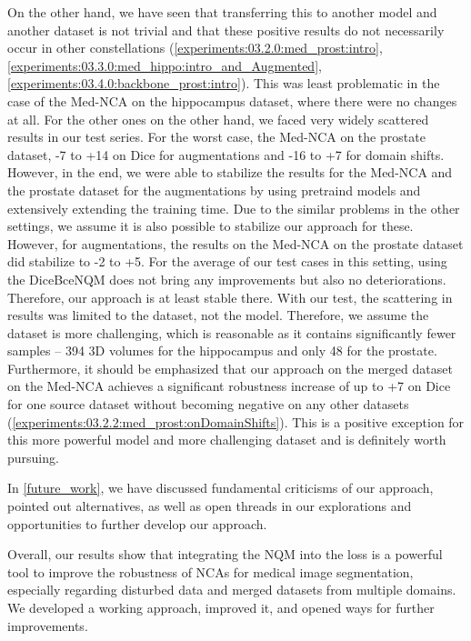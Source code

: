 On the other hand, we have seen that transferring this to another model and another dataset is not trivial and that these positive results do not necessarily occur in other constellations (\autoref{experiments:03.2.0:med_prost:intro}, \ref{experiments:03.3.0:med_hippo:intro_and_Augmented}, \ref{experiments:03.4.0:backbone_prost:intro}). This was least problematic in the case of the Med-NCA on the hippocampus dataset, where there were no changes at all. For the other ones on the other hand, we faced very widely scattered results in our test series. For the worst case, the Med-NCA on the prostate dataset, -7 to +14 on Dice for augmentations and -16 to +7 for domain shifts. However, in the end, we were able to stabilize the results for the Med-NCA and the prostate dataset for the augmentations by using pretraind models and extensively extending the training time. Due to the similar problems in the other settings, we assume it is also possible to stabilize our approach for these. However, for augmentations, the results on the Med-NCA on the prostate dataset did stabilize to -2 to +5. For the average of our test cases in this setting, using the DiceBceNQM does not bring any improvements but also no deteriorations. Therefore, our approach is at least stable there.
With our test, the scattering in results was limited to the dataset, not the model. Therefore, we assume the dataset is more challenging, which is reasonable as it contains significantly fewer samples -- 394 3D volumes for the hippocampus and only 48 for the prostate.
Furthermore, it should be emphasized that our approach on the merged dataset on the Med-NCA achieves a significant robustness increase of up to +7 on Dice for one source dataset without becoming negative on any other datasets (\autoref{experiments:03.2.2:med_prost:onDomainShifts}). This is a positive exception for this more powerful model and more challenging dataset and is definitely worth pursuing. 


In \autoref{future_work}, we have discussed fundamental criticisms of our approach, pointed out alternatives, as well as open threads in our explorations and opportunities to further develop our approach.


Overall, our results show that integrating the NQM into the loss is a powerful tool to improve the robustness of NCAs for medical image segmentation, especially regarding disturbed data and merged datasets from multiple domains. We developed a working approach, improved it, and opened ways for further improvements.
